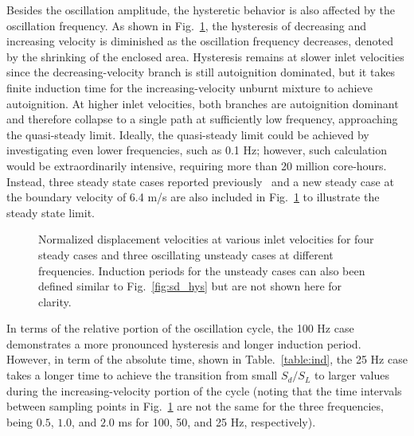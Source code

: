 \documentclass[review,3p,times]{elsarticle}
\begin{document}
\textcolor{Rev1}{Besides the oscillation amplitude, the hysteretic behavior is also affected by the oscillation frequency.}  As shown in Fig.~\ref{fig:sd_hys_frq}, the hysteresis of decreasing and increasing velocity is diminished as the oscillation frequency decreases, denoted by the shrinking of the enclosed area.  Hysteresis remains at slower inlet velocities since the decreasing-velocity branch is still autoignition dominated, but it takes finite induction time for the increasing-velocity unburnt mixture to achieve autoignition.  At higher inlet velocities, both branches are autoignition dominant and therefore collapse to a single path at sufficiently low frequency, approaching the quasi-steady limit.  \textcolor{Rev1}{Ideally, the quasi-steady limit could be achieved by investigating even lower frequencies, such as 0.1 Hz; however, such calculation would be extraordinarily intensive, requiring more than 20 million core-hours.  Instead, three steady state cases reported previously~\cite{deng15b} and a new steady case at the boundary velocity of 6.4 m/s are also included in Fig.~\ref{fig:sd_hys_frq} to illustrate the steady state limit.}  

\begin{figure}[t]
  \centering
  \scriptsize
  \resizebox{0.5\textwidth}{!}{}
  \normalsize
  \vspace{-0.2in}
  \caption{\textcolor{Rev1}{Normalized displacement velocities at various inlet velocities for four steady cases and three oscillating unsteady cases at different frequencies.  Induction periods for the unsteady cases can also been defined similar to Fig.~\ref{fig:sd_hys} but are not shown here for clarity.}}
  \label{fig:sd_hys_frq}
\end{figure}

\textcolor{Rev1}{In terms of the relative portion of the oscillation cycle, the 100 Hz case demonstrates a more pronounced hysteresis and longer induction period.  However, in term of the absolute time, shown in Table.~\ref{table:ind}, the 25 Hz case takes a longer time to achieve the transition from small $S_d/S_L$ to larger values during the increasing-velocity portion of the cycle (noting that the time intervals between sampling points in Fig.~\ref{fig:sd_hys_frq} are not the same for the three frequencies, being $0.5$, $1.0$, and $2.0$ ms for 100, 50, and 25 Hz, respectively).}

\begin{table}
  \caption{\textcolor{Rev1}{Induction time at different oscillation frequencies.}}
  \label{table:ind}
  \centering
  \normalsize
\end{table}
\end{document}
